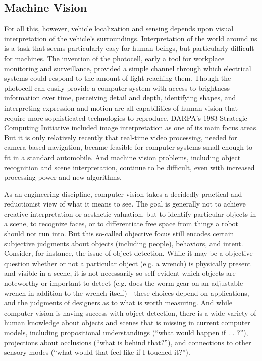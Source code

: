 \subsection{Machine Vision}
For all this, however, vehicle localization and sensing depends upon
visual interpretation of the vehicle's surroundings. Interpretation of
the world around us is a task that seems
particularly easy for human beings, but particularly difficult for
machines. The invention of the photocell, early a tool for workplace
monitoring and surveillance, provided a simple channel through which
electrical systems could respond to the amount of light reaching
them.\cite{???} Though the photocell can easily provide a computer system
with access to brightness information over time, perceiving detail and
depth, identifying shapes, and interpreting expression and motion are
all capabilities of human vision that require more sophisticated
technologies to reproduce. DARPA's 1983 Strategic Computing Initiative
included image interpretation as one of its main
focus areas.\cite{???} But it is only relatively recently that real-time video
processing, needed for camera-based navigation, became feasible for computer
systems small enough to fit in a standard automobile.\cite{???} And machine
vision problems, including object recognition and scene
interpretation, continue to be difficult, even with increased
processing power and new algorithms. 

As an engineering discipline, computer vision takes a decidedly
practical and reductionist view of what it means to see. The goal is
generally not to achieve creative interpretation or aesthetic
valuation, but to identify particular objects in a scene, to recognize
faces, or to differentiate free space from things a robot should
not run into.\cite{???} But this so-called objective focus still encodes
certain subjective judgments about objects (including people),
behaviors, and intent. Consider, for instance, the issue of object
detection. While it may be a objective question whether or not a
particular object (e.g. a wrench) is physically present and visible in a scene, it is not
necessarily so self-evident which objects are noteworthy or important
to detect (e.g. does the worm gear on an adjustable wrench in addition
to the wrench itself)---these choices depend on applications, and the judgments of
designers as to what is worth measuring. And while computer vision is having success
with object detection, there is a wide variety of human knowledge
about objects and scenes that is missing in current computer
models, including propositional understandings (``what would happen if
. . ?''), projections about occlusions (``what is behind that?''), and
connections to other sensory modes (``what would that feel like if I
touched it?'').\cite{???} 

